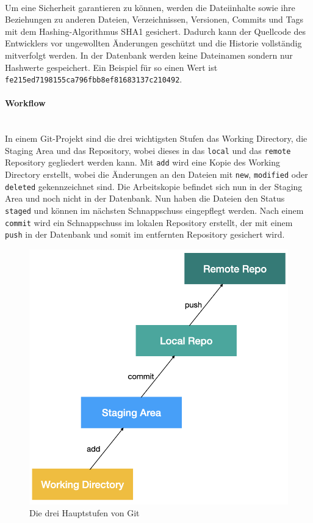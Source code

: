 \mbox{}\\Um eine Sicherheit garantieren zu können, werden die Dateiinhalte sowie ihre Beziehungen zu anderen Dateien, Verzeichnissen, Versionen, Commits und Tags mit dem Hashing-Algorithmus SHA1 gesichert. Dadurch kann der Quellcode des Entwicklers vor ungewollten Änderungen geschützt und die Historie vollständig mitverfolgt werden. In der Datenbank werden keine Dateinamen sondern nur Hashwerte gespeichert. Ein Beispiel für so einen Wert ist \texttt{fe215ed7198155ca796fbb8ef81683137c210492}.\\

\paragraph{Workflow}\mbox{}\\
In einem Git-Projekt sind die drei wichtigsten Stufen das Working Directory, die Staging Area und das Repository, wobei dieses in das \texttt{local} und das  \texttt{remote} Repository gegliedert werden kann. Mit  \texttt{add} wird eine Kopie des Working Directory erstellt, wobei die Änderungen an den Dateien mit  \texttt{new},  \texttt{modified} oder  \texttt{deleted} gekennzeichnet sind. Die Arbeitskopie befindet sich nun in der Staging Area und noch nicht in der Datenbank. Nun haben die Dateien den Status  \texttt{staged} und können im nächsten Schnappschuss eingepflegt werden. Nach einem  \texttt{commit} wird ein Schnappschuss im lokalen Repository erstellt, der mit einem  \texttt{push} in der Datenbank und somit im entfernten Repository gesichert wird.

\begin{figure}[H]
\begin{center}
	\includegraphics[scale=.3]{images/git_workflow.png}
\end{center}
	\caption{Die drei Hauptstufen von Git}
\end{figure}

